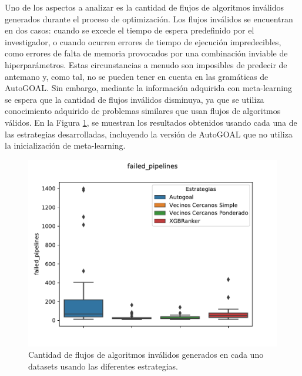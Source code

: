Uno de los aspectos a analizar es la cantidad de flujos de algoritmos inválidos generados durante el proceso de optimización. Los flujos inválidos se encuentran en dos casos: cuando se excede el tiempo de espera predefinido por el investigador, o cuando ocurren errores de tiempo de ejecución impredecibles, como errores de falta de memoria provocados por una combinación inviable de hiperparámetros. Estas circunstancias a menudo son imposibles de predecir de antemano y, como tal, no se pueden tener en cuenta en las gramáticas de AutoGOAL. Sin embargo, mediante la información adquirida con meta-learning se espera que la cantidad de flujos inválidos disminuya, ya que se utiliza conocimiento adquirido de problemas similares que usan flujos de algoritmos válidos. En la Figura \ref{fig:failedpipelines}, se muestran los resultados obtenidos usando cada una de las estrategias desarrolladas, incluyendo la versión de AutoGOAL que no utiliza la inicialización de meta-learning.

\begin{figure}[H]
\centering
\includegraphics[scale=.75]{Figures/failed-pipelines.pdf}
\caption{Cantidad de flujos de algoritmos inválidos generados en cada uno datasets usando las diferentes estrategias.}
\label{fig:failedpipelines}
\end{figure}

